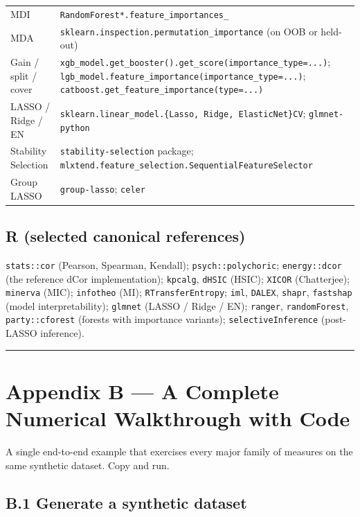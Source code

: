 \documentclass{article}
\let\oldsection\section
\renewcommand{\section}{\clearpage\oldsection}
\begin{document}
{\begin{longtable}[]{@{}ll@{}}
MDI & \texttt{RandomForest*.feature\_importances\_} \\
MDA & \texttt{sklearn.inspection.permutation\_importance} (on OOB or
held-out) \\
Gain / split / cover &
\texttt{xgb\_model.get\_booster().get\_score(importance\_type=...)};
\texttt{lgb\_model.feature\_importance(importance\_type=...)};
\texttt{catboost.get\_feature\_importance(type=...)} \\
LASSO / Ridge / EN &
\texttt{sklearn.linear\_model.\{Lasso,\ Ridge,\ ElasticNet\}CV};
\texttt{glmnet-python} \\
Stability Selection & \texttt{stability-selection} package;
\texttt{mlxtend.feature\_selection.SequentialFeatureSelector} \\
Group LASSO & \texttt{group-lasso}; \texttt{celer} \\
\end{longtable}
}

\subsection{R (selected canonical
references)}\label{r-selected-canonical-references}

\texttt{stats::cor} (Pearson, Spearman, Kendall);
\texttt{psych::polychoric}; \texttt{energy::dcor} (the reference dCor
implementation); \texttt{kpcalg}, \texttt{dHSIC} (HSIC); \texttt{XICOR}
(Chatterjee); \texttt{minerva} (MIC); \texttt{infotheo} (MI);
\texttt{RTransferEntropy}; \texttt{iml}, \texttt{DALEX}, \texttt{shapr},
\texttt{fastshap} (model interpretability); \texttt{glmnet} (LASSO /
Ridge / EN); \texttt{ranger}, \texttt{randomForest},
\texttt{party::cforest} (forests with importance variants);
\texttt{selectiveInference} (post-LASSO inference).

\begin{center}\rule{0.5\linewidth}{0.5pt}\end{center}

\section{Appendix B --- A Complete Numerical Walkthrough with
Code}\label{appendix-b--a-complete-numerical-walkthrough-with-code}

A single end-to-end example that exercises every major family of
measures on the same synthetic dataset. Copy and run.

\subsection{B.1 Generate a synthetic
dataset}\label{b1-generate-a-synthetic-dataset}
\end{document}

